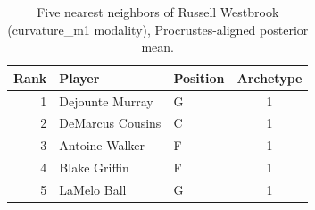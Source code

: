 \begin{table}[htbp]
  \centering\small
  \begin{tabular}{rllc}
    \toprule
    Rank & Player & Position & Archetype \\
    \midrule
    1 & Dejounte Murray & G & 1 \\
    2 & DeMarcus Cousins & C & 1 \\
    3 & Antoine Walker & F & 1 \\
    4 & Blake Griffin & F & 1 \\
    5 & LaMelo Ball & G & 1 \\
    \bottomrule
  \end{tabular}
  \caption{Five nearest neighbors of Russell Westbrook (curvature_m1 modality), Procrustes-aligned posterior mean.}
  \label{tab:Russell_Westbrook_neighbors_curvature_m1}
\end{table}


